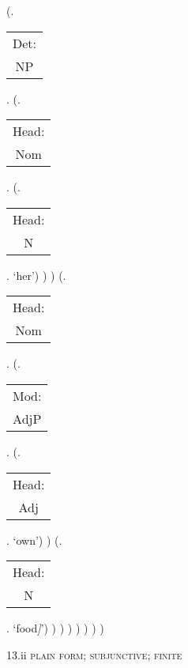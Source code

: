 \documentclass[12pt,letterpaper]{article}
\begin{document}
\begin{figure}
\begin{center}
\begin{parsetree}
			(.\begin{tabular}{c}Det:\\NP\end{tabular}.  
			(.\begin{tabular}{c}Head:\\Nom\end{tabular}.
			(.\begin{tabular}{c}Head:\\N\end{tabular}. `her')
			)
			)
			(.\begin{tabular}{c}Head:\\Nom\end{tabular}.
			(.\begin{tabular}{c}Mod:\\AdjP\end{tabular}.
			(.\begin{tabular}{c}Head:\\Adj\end{tabular}. `own')
			)
			(.\begin{tabular}{c}Head:\\N\end{tabular}. `food\emph{]}')
			)
			)
			)
			)
			)
			)
			)
			
		\end{parsetree}
		\hfill \break \hfill \break
		13.ii \textsc{plain form; subjunctive; finite}
	\end{center}
\end{figure}	
\end{document}
